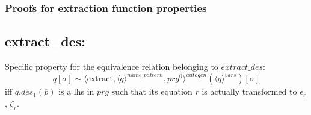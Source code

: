 \documentclass[11pt]{article} %
\begin{document}
\subsubsection{Proofs for extraction function properties}

\subsection*{extract\_des:}

Specific property for the equivalence relation belonging to $extract\_des$:
\begin{equation*}
q[\sigma] \sim \langle \textrm{extract}, \langle q \rangle^{name\_pattern}, prg^0 \rangle^{autogen}(\langle q \rangle^{vars})[\sigma]
\end{equation*}
iff $q.des_1(\overline{p})$ is a lhs in $prg$ such that its equation $r$ is actually transformed to $\epsilon_r$, $\zeta_r$.
\end{document}
